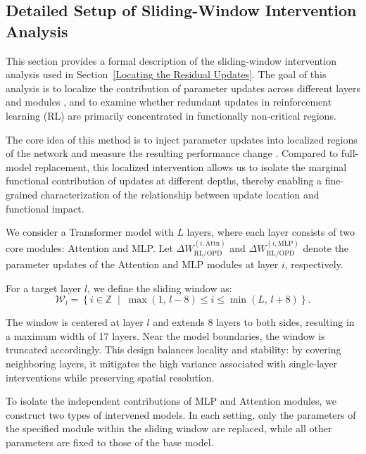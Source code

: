 \documentclass{llmxive}
\begin{document}
\subsection{Detailed Setup of Sliding-Window Intervention Analysis}
\label{Detailed Setup of Sliding-Window Intervention Analysis}

This section provides a formal description of the sliding-window intervention analysis used in Section~\ref{Locating the Residual Updates}. The goal of this analysis is to localize the contribution of parameter updates across different layers and modules \citep{cai2024locatingmitigatinggenderbias,cai2025predictability}, and to examine whether redundant updates in reinforcement learning (RL) are primarily concentrated in functionally non-critical regions.

The core idea of this method is to inject parameter updates into localized regions of the network and measure the resulting performance change \citep{meng2023locatingeditingfactualassociations, vig2020investigating}. Compared to full-model replacement, this localized intervention allows us to isolate the marginal functional contribution of updates at different depths, thereby enabling a fine-grained characterization of the relationship between update location and functional impact.

We consider a Transformer model with \(L\) layers, where each layer consists of two core modules: Attention and MLP. Let \(\Delta W_{\text{RL/OPD}}^{(i,\text{Attn})}\) and \(\Delta W_{\text{RL/OPD}}^{(i,\text{MLP})}\) denote the parameter updates of the Attention and MLP modules at layer \(i\), respectively.

For a target layer \(l\), we define the sliding window as:
\begin{equation}
\mathcal{W}_l = \left\{ i \in \mathbb{Z} \;\middle|\; \max(1,\, l-8) \le i \le \min(L,\, l+8) \right\}.
\end{equation}

The window is centered at layer \(l\) and extends 8 layers to both sides, resulting in a maximum width of 17 layers. Near the model boundaries, the window is truncated accordingly. This design balances locality and stability: by covering neighboring layers, it mitigates the high variance associated with single-layer interventions while preserving spatial resolution.

To isolate the independent contributions of MLP and Attention modules, we construct two types of intervened models. In each setting, only the parameters of the specified module within the sliding window are replaced, while all other parameters are fixed to those of the base model.
\end{document}
